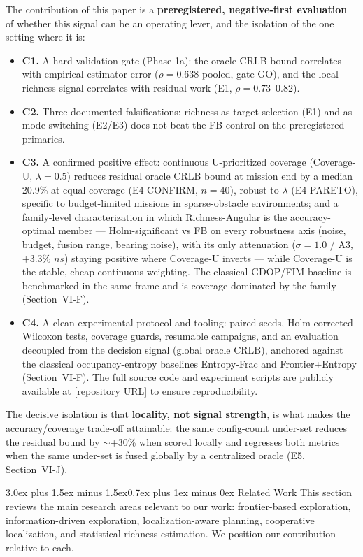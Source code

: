\documentclass[journal]{IEEEtran}
\makeatletter
\newcommand{\CU}{Coverage-U}
\newcommand{\RA}{Richness-Angular}
\renewcommand{\section}{\@startsection{section}{1}{\z@}%
{3.0ex plus 1.5ex minus 1.5ex}{0.7ex plus 1ex minus 0ex}%
{\normalfont\large\bfseries\scshape\centering}}
\makeatother
\begin{document}
The contribution of this paper is a \textbf{preregistered, negative-first
evaluation} of whether this signal can be an operating lever, and the
isolation of the one setting where it is:
\begin{itemize}
\item \textbf{C1.} A hard validation gate (Phase 1a): the oracle CRLB bound
correlates with empirical estimator error ($\rho = 0.638$ pooled, gate GO),
and the local richness signal correlates with residual work (E1,
$\rho = 0.73$--$0.82$).
\item \textbf{C2.} Three documented falsifications: richness as
target-selection (E1) and as mode-switching (E2/E3) does not beat the FB
control on the preregistered primaries.
\item \textbf{C3.} A confirmed positive effect: continuous U-prioritized
coverage (\CU, $\lambda = 0.5$) reduces residual oracle CRLB bound at mission
end by a median 20.9\% at equal coverage (E4-CONFIRM, $n=40$), robust to
$\lambda$ (E4-PARETO), specific to budget-limited missions in sparse-obstacle
environments; and a family-level characterization in which \RA{} is the
accuracy-optimal member --- Holm-significant vs FB on every robustness axis
(noise, budget, fusion range, bearing noise), with its only attenuation
($\sigma = 1.0$ / A3, $+3.3\%$ $ns$) staying positive where \CU{} inverts ---
while \CU{} is the stable, cheap continuous weighting. The classical GDOP/FIM
baseline is benchmarked in
the same frame and is coverage-dominated by the family (Section~VI-F).
\item \textbf{C4.} A clean experimental protocol and tooling: paired seeds,
Holm-corrected Wilcoxon tests, coverage guards, resumable campaigns, and an
evaluation decoupled from the decision signal (global oracle CRLB), anchored
against the classical occupancy-entropy baselines Entropy-Frac and
Frontier+Entropy (Section~VI-F). The full source code and experiment scripts
are publicly available at [repository URL] to ensure reproducibility.
\end{itemize}

The decisive isolation is that \textbf{locality, not signal strength}, is what
makes the accuracy/coverage trade-off attainable: the same config-count
under-set reduces the residual bound by $\sim$+30\% when scored locally and
regresses both metrics when the same under-set is fused globally by a
centralized oracle (E5, Section~VI-J).


\section{Related Work}
This section reviews the main research areas relevant to our work:
frontier-based exploration, information-driven exploration,
localization-aware planning, cooperative localization, and statistical
richness estimation. We position our contribution relative to each.
\end{document}
